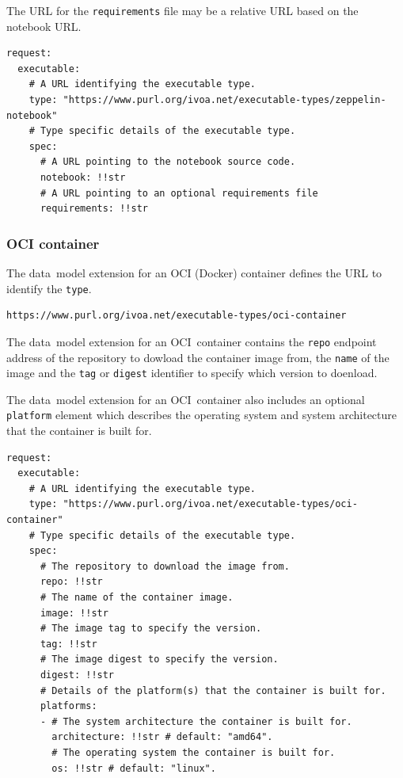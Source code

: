 \documentclass[11pt,a4paper]{ivoa}
\newcommand{\datamodel} {data~model}
\newcommand{\oci} {OCI}
\newcommand{\ocicontainer} {OCI~container}
\newcommand{\codeword}[1] {\texttt{#1}}
\begin{document}
The URL for the \codeword{requirements} file may be a relative URL based on the notebook URL.

\begin{lstlisting}[]
request:
  executable:
    # A URL identifying the executable type.
    type: "https://www.purl.org/ivoa.net/executable-types/zeppelin-notebook"
    # Type specific details of the executable type.
    spec:
      # A URL pointing to the notebook source code.
      notebook: !!str
      # A URL pointing to an optional requirements file
      requirements: !!str
\end{lstlisting}

\subsubsection{OCI container}
\label{datamodel-oci-container}

The \datamodel{} extension for an \oci{} (Docker) container defines the URL
to identify the \codeword{type}.

\begin{lstlisting}[]
https://www.purl.org/ivoa.net/executable-types/oci-container
\end{lstlisting}

The \datamodel{} extension for an \ocicontainer{} contains
the \codeword{repo} endpoint address of the repository to dowload the
container image from, the \codeword{name} of the image and the \codeword{tag}
or \codeword{digest} identifier to specify which version to doenload.

The \datamodel{} extension for an \ocicontainer{} also includes
an optional \codeword{platform} element which describes the operating system
and system architecture that the container is built for.

\begin{lstlisting}[]
request:
  executable:
    # A URL identifying the executable type.
    type: "https://www.purl.org/ivoa.net/executable-types/oci-container"
    # Type specific details of the executable type.
    spec:
      # The repository to download the image from.
      repo: !!str
      # The name of the container image.
      image: !!str
      # The image tag to specify the version.
      tag: !!str
      # The image digest to specify the version.
      digest: !!str
      # Details of the platform(s) that the container is built for.
      platforms:
      - # The system architecture the container is built for.
        architecture: !!str # default: "amd64".
        # The operating system the container is built for.
        os: !!str # default: "linux".
\end{lstlisting}
\end{document}
